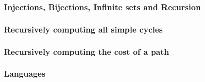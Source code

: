 \documentclass[twocolumn,a4paper]{article}
\newcommand{\image}[1]{
\begin{figure}[ht]
	\centering
	\fbox{\resizebox{0.85\columnwidth}{!}{\texttt{[image: \#1]}}}
\end{figure}
}
\begin{document}
\newpage
\subsubsection*{Injections, Bijections, Infinite sets and Recursion}
\image{misc/2018-2-2.png}

\newpage
\subsubsection*{Recursively computing all simple cycles}
\image{misc/vertecies-uppg.png}

\newpage
\subsubsection*{Recursively computing the cost of a path}
\image{misc/5-1.png}

\newpage
\subsubsection*{Languages}
\image{misc/languages.png}
\end{document}
